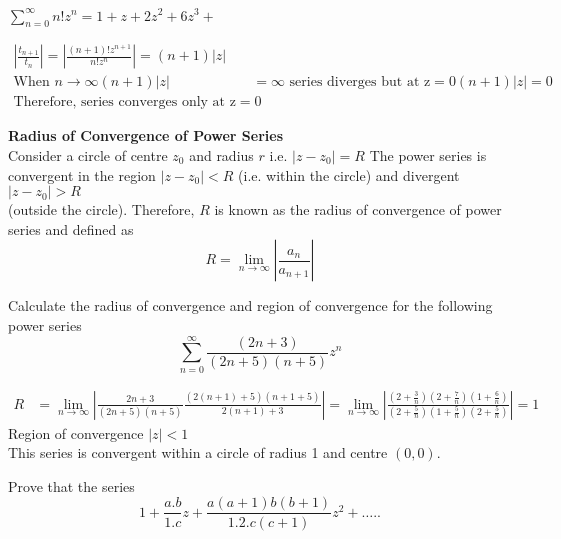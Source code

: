 \begin{exercise}
	$\sum_{n=0}^{\infty} n ! z^{n}=1+z+2 z^{2}+6 z^{3}+$
\end{exercise}
\begin{answer}
	\begin{align*}
	\left|\frac{t_{n+1}}{t_{n}}\right|=\left|\frac{(n+1) ! z^{n+1}}{n ! z^{n}}\right|=(n+1)|z|\\
	\text{When }n \rightarrow \infty(n+1)|z|&=\infty\text{ series diverges but at }\mathrm{z}=0(n+1)|z|=0\\
	 \text{Therefore, series converges only at }\mathrm{z}=0
	\end{align*}
\end{answer}
\textbf{Radius of Convergence of Power Series}\\
Consider a circle of centre $z_{0}$ and radius $r$ i.e. $\left|z-z_{0}\right|=R$
The power series is convergent in the region $\left|z-z_{0}\right|<R$ (i.e. within the circle) and divergent $\left|z-z_{0}\right|>R$\\ (outside the circle). Therefore, $R$ is known as the radius of convergence of power series and defined as\\
$$R=\lim _{n \rightarrow \infty}\left|\frac{a_{n}}{a_{n+1}}\right|$$
\begin{exercise}
	Calculate the radius of convergence and region of convergence for the following power series
	$$
	\sum_{n=0}^{\infty} \frac{(2 n+3)}{(2 n+5)(n+5)} z^{n}
	$$
\end{exercise}
\begin{answer}
	\begin{align*}
	R&=\lim _{n \rightarrow \infty}\left|\frac{2 n+3}{(2 n+5)(n+5)} \frac{(2(n+1)+5)(n+1+5)}{2(n+1)+3}\right|=\lim _{n \rightarrow \infty}\left|\frac{\left(2+\frac{3}{n}\right)\left(2+\frac{7}{n}\right)\left(1+\frac{6}{n}\right)}{\left(2+\frac{5}{n}\right)\left(1+\frac{5}{n}\right)\left(2+\frac{5}{n}\right)}\right|=1
	\end{align*}
	Region of convergence $|z|<1$\\
	This series is convergent within a circle of radius 1 and centre $(0,0)$.
\end{answer}
\begin{exercise}
	Prove that the series
	$$
	1+\frac{a . b}{1 . c} z+\frac{a(a+1) b(b+1)}{1.2 . c(c+1)} z^{2}+\ldots . .
	$$
\end{exercise}
